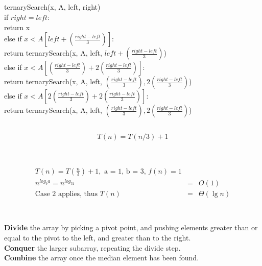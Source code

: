 \documentclass{report}
\begin{document}
\subsection{}
ternarySearch(x, A, left, right)\\
 \tab if $right = left:$\\
 \tab \tab return x\\
 \tab else if $x < A[left + \left(\frac{right - left}{3}\right)]:$\\[2mm]
 \tab \tab return ternarySearch(x, A, left, $left + \left(\frac{right - left}{3}\right)$)\\[2mm]
 \tab else if $x < A[\left(\frac{right - left}{3}\right) + 2\left(\frac{right - left}{3}\right)]:$\\[2mm]
 \tab\tab return ternarySearch(x, A, left, $\left(\frac{right - left}{3}\right), 2\left(\frac{right - left}{3}\right)$)\\[2mm]
 \tab else if  $x < A[2\left(\frac{right - left}{3}\right) + 2\left(\frac{right - left}{3}\right)]:$\\[2mm]
 \tab\tab return ternarySearch(x, A, left, $\left(\frac{right - left}{3}\right), 2\left(\frac{right - left}{3}\right)$)\\[2mm]

 \subsection{}
   $$T(n) = T(n/3) + 1$$\\

 \subsection{}
\begin{eqnarray*}
  T(n) = T\left(\frac{n}{3}\right) + 1,\text{ a = 1, b = 3, }f(n) = 1 \\
  n^{log_ba} = n^{log_31} &=& O(1) \\
  \text{Case 2 applies, thus } T(n) &=& \Theta(\lg n) \\
\end{eqnarray*}
\newpage
\section{}
\subsection{}
\textbf{Divide} the array by picking a pivot point, and pushing elements greater than or equal to the pivot to the left, and greater than to the right. \\
\textbf{Conquer} the larger subarray, repeating the divide step.\\
\textbf{Combine} the array once the median element has been found. \\
\end{document}

